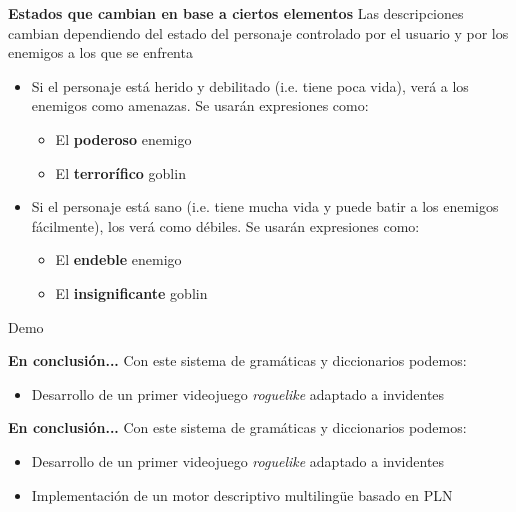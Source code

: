 \begin{frame}[c]{\textbf{Estados que cambian en base a ciertos elementos}}
	Las descripciones cambian dependiendo del estado del personaje controlado por el usuario y por los enemigos a los que se enfrenta
	\begin{itemize}
		\item Si el personaje está herido y debilitado (i.e. tiene poca vida), verá a los enemigos como amenazas. Se usarán expresiones como:
		\begin{itemize}
			\item El \textbf{poderoso} enemigo
			\item El \textbf{terrorífico} goblin
		\end{itemize}
		\item Si el personaje está sano (i.e. tiene mucha vida y puede batir a los enemigos fácilmente), los verá como débiles. Se usarán expresiones como:
		\begin{itemize}
			\item El \textbf{endeble} enemigo
			\item El \textbf{insignificante} goblin
		\end{itemize}
	\end{itemize}
\end{frame}

\begin{frame}[c]{}
	\begin{center}
		\Huge Demo
	\end{center}
\end{frame}


\begin{tframe}{\textbf{En conclusión...}}
	Con este sistema de gramáticas y diccionarios podemos:
	\begin{itemize}
		\item<+-| alert@+> Desarrollo de un primer videojuego \textit{roguelike} adaptado a invidentes
	\end{itemize}
\end{tframe}

\begin{tframe}{\textbf{En conclusión...}}
	Con este sistema de gramáticas y diccionarios podemos:
	\begin{itemize}
		\item Desarrollo de un primer videojuego \textit{roguelike} adaptado a invidentes
		\item<+-| alert@+> Implementación de un motor descriptivo multilingüe basado en PLN
	\end{itemize}
\end{tframe}

